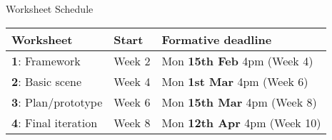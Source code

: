 \begin{frame}{Worksheet Schedule}
	\begin{center}
		\begin{tabular}{|l l l|}
			\hline
			\textbf{Worksheet} & \textbf{Start} & \textbf{Formative deadline} \\
			\hline
			\textbf{1}: Framework & Week 2 & Mon \textbf{15th Feb} 4pm (Week 4) \\
			\hline
			\textbf{2}: Basic scene & Week 4 & Mon \textbf{1st Mar} 4pm (Week 6) \\
			\hline
			\textbf{3}: Plan/prototype & Week 6 & Mon \textbf{15th Mar} 4pm (Week 8) \\
			\hline
			\textbf{4}: Final iteration & Week 8 & Mon \textbf{12th Apr} 4pm (Week 10) \\
			\hline
		\end{tabular}
	\end{center}
\end{frame}
